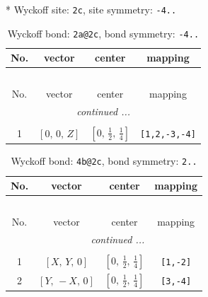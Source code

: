 \documentclass[fleqn,8pt]{jsarticle}
\begin{document}
* Wyckoff site: {\tt 2c}, site symmetry: {\tt -4..}
\renewcommand{\arraystretch}{1.2}
\begin{longtable}{cccc}
\caption{Wyckoff bond: {\tt 2a@2c}, bond symmetry: {\tt -4..}}
 \\
 \hline \hline
No. & vector & center & mapping \\ \hline \endfirsthead

\multicolumn{3}{l}{\tablename\ \thetable{}} \\
 \hline \hline
No. & vector & center & mapping \\ \hline \endhead

 \hline \hline
\multicolumn{3}{r}{\footnotesize\it continued ...} \\ \endfoot

 \hline \hline
\multicolumn{3}{r}{} \\ \endlastfoot

1 & $\left[ 0,\, 0,\, Z \right]$ & $\left[ 0,\, \frac{1}{2},\, \frac{1}{4} \right]$ & {\tt [1,2,-3,-4]} \\
\end{longtable}
\renewcommand{\arraystretch}{1.2}
\begin{longtable}{cccc}
\caption{Wyckoff bond: {\tt 4b@2c}, bond symmetry: {\tt 2..}}
 \\
 \hline \hline
No. & vector & center & mapping \\ \hline \endfirsthead

\multicolumn{3}{l}{\tablename\ \thetable{}} \\
 \hline \hline
No. & vector & center & mapping \\ \hline \endhead

 \hline \hline
\multicolumn{3}{r}{\footnotesize\it continued ...} \\ \endfoot

 \hline \hline
\multicolumn{3}{r}{} \\ \endlastfoot

1 & $\left[ X,\, Y,\, 0 \right]$ & $\left[ 0,\, \frac{1}{2},\, \frac{1}{4} \right]$ & {\tt [1,-2]} \\ \hline
2 & $\left[ Y,\, - X,\, 0 \right]$ & $\left[ 0,\, \frac{1}{2},\, \frac{1}{4} \right]$ & {\tt [3,-4]} \\
\end{longtable}
\renewcommand{\arraystretch}{1.2}
\end{document}
